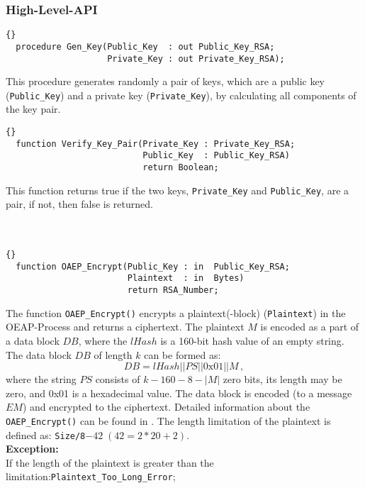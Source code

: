 \subsubsection*{High-Level-API}
\begin{lstlisting}{}
  procedure Gen_Key(Public_Key  : out Public_Key_RSA;
                    Private_Key : out Private_Key_RSA);
\end{lstlisting}
This procedure generates randomly a pair of keys, which are a public key (\texttt{Public\_Key}) and a private key (\texttt{Private\_Key}), by calculating all components of the key pair.\\
\begin{lstlisting}{}
  function Verify_Key_Pair(Private_Key : Private_Key_RSA;
                           Public_Key  : Public_Key_RSA) 
                           return Boolean;
\end{lstlisting}
This function returns true if the two keys, \texttt{Private\_Key} and \texttt{Public\_Key}, are a pair, if not, then false is returned.\\
\hline \\ \ \\
\begin{lstlisting}{}
  function OAEP_Encrypt(Public_Key : in  Public_Key_RSA;
                        Plaintext  : in  Bytes) 
                        return RSA_Number;
\end{lstlisting}
The function \texttt{OAEP\_Encrypt()} encrypts a plaintext(-block) (\texttt{Plaintext}) in the OEAP-Process and returns a ciphertext. 
The plaintext $M$ is encoded as a part of a data block $DB$, where the $lHash$ is a 160-bit hash value of an empty string. The data block $DB$ of length $k$ can be formed as:
\begin{equation*}
DB=lHash||PS||0\mbox{x}01||M\,,
\end{equation*}
where the string $PS$ consists of $k-160-8-|M|$ zero bits, its length may be zero, and 0x01 is a hexadecimal value. The data block is encoded (to a message $EM$) and encrypted to the ciphertext.
Detailed information about the \texttt{OAEP\_Encrypt()} can be found in \cite{PKCS}. The length limitation of the plaintext is defined as:
\texttt{Size/8}$-42\;(42=2*20+2)$.\\
\textbf{Exception:}\\
If the length of the plaintext is greater than the limitation:\quad \texttt{Plaintext\_Too\_Long\_Error};\\
\hline \\ \ \\
